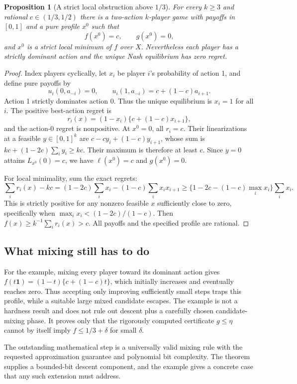 \documentclass[11pt,a4paper]{article}
\newtheorem{proposition}[theorem]{Proposition}
\begin{document}
\begin{proposition}[A strict local obstruction above $1/3$]
For every $k\geq3$ and rational $c\in(1/3,1/2)$ there is a two-action $k$-player game with payoffs in $[0,1]$ and a pure profile $x^0$ such that
\[
 f(x^0)=c,\qquad g(x^0)=0,
\]
and $x^0$ is a strict local minimum of $f$ over $X$. Nevertheless each player has a strictly dominant action and the unique Nash equilibrium has zero regret.
\end{proposition}
\begin{proof}
Index players cyclically, let $x_i$ be player $i$'s probability of action 1, and define pure payoffs by
\[
 u_i(0,a_{-i})=0,\qquad
 u_i(1,a_{-i})=c+(1-c)a_{i+1}.
\]
Action 1 strictly dominates action 0. Thus the unique equilibrium is $x_i=1$ for all $i$. The positive best-action regret is
\[
 r_i(x)=(1-x_i)\{c+(1-c)x_{i+1}\},
\]
and the action-0 regret is nonpositive. At $x^0=0$, all $r_i=c$. Their linearizations at a feasible $y\in[0,1]^k$ are
$c-cy_i+(1-c)y_{i+1}$, whose sum is
$kc+(1-2c)\sum_i y_i\geq kc$.
Their maximum is therefore at least $c$. Since $y=0$ attains $L_{x^0}(0)=c$, we have $\ell(x^0)=c$ and $g(x^0)=0$.

For local minimality, sum the exact regrets:
\[
 \sum_i r_i(x)-kc
 =(1-2c)\sum_i x_i-(1-c)\sum_i x_ix_{i+1}
 \geq\{1-2c-(1-c)\max_i x_i\}\sum_i x_i.
\]
This is strictly positive for any nonzero feasible $x$ sufficiently close to zero, specifically when $\max_i x_i<(1-2c)/(1-c)$. Then $f(x)\geq k^{-1}\sum_i r_i(x)>c$. All payoffs and the specified profile are rational.
\end{proof}

\subsection*{What mixing still has to do}
For the example, mixing every player toward its dominant action gives
$f(t\mathbf1)=(1-t)\{c+(1-c)t\}$, which initially increases and eventually reaches zero. Thus accepting only improving sufficiently small steps traps this profile, while a suitable large mixed candidate escapes. The example is not a hardness result and does not rule out descent plus a carefully chosen candidate-mixing phase. It proves only that the rigorously computed certificate $g\leq\eta$ cannot by itself imply $f\leq1/3+\delta$ for small $\delta$.

The outstanding mathematical step is a universally valid mixing rule with the requested approximation guarantee and polynomial bit complexity. The theorem supplies a bounded-bit descent component, and the example gives a concrete case that any such extension must address.
\end{document}
